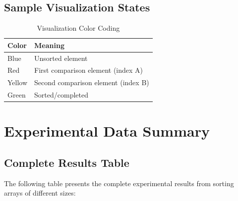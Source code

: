 \documentclass[12pt,a4paper]{article}
\begin{document}
\subsection{Sample Visualization States}

\begin{table}[H]
\centering
\caption{Visualization Color Coding}
\begin{tabular}{@{}ll@{}}
\toprule
\textbf{Color} & \textbf{Meaning} \\
\midrule
Blue & Unsorted element \\
Red & First comparison element (index A) \\
Yellow & Second comparison element (index B) \\
Green & Sorted/completed \\
\bottomrule
\end{tabular}
\end{table}

\section{Experimental Data Summary}

\subsection{Complete Results Table}

The following table presents the complete experimental results from sorting arrays of different sizes:
\end{document}
